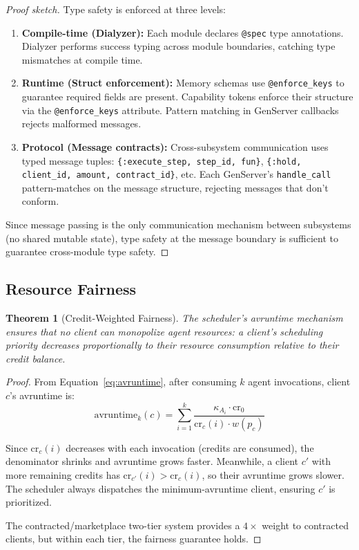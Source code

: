 \documentclass[12pt,a4paper]{article}
\newtheorem{theorem}{Theorem}[section]
\theoremstyle{definition}
\begin{document}
\begin{proof}[Proof sketch]
Type safety is enforced at three levels:

\begin{enumerate}
  \item \textbf{Compile-time (Dialyzer):} Each module declares \texttt{@spec} type
        annotations. Dialyzer performs success typing across module boundaries,
        catching type mismatches at compile time.

  \item \textbf{Runtime (Struct enforcement):} Memory schemas use
        \texttt{@enforce\_keys} to guarantee required fields are present.
        Capability tokens enforce their structure via the \texttt{@enforce\_keys}
        attribute. Pattern matching in GenServer callbacks rejects malformed messages.

  \item \textbf{Protocol (Message contracts):} Cross-subsystem communication uses
        typed message tuples: \texttt{\{:execute\_step, step\_id, fun\}},
        \texttt{\{:hold, client\_id, amount, contract\_id\}}, etc. Each GenServer's
        \texttt{handle\_call} pattern-matches on the message structure, rejecting
        messages that don't conform.
\end{enumerate}

Since message passing is the only communication mechanism between subsystems
(no shared mutable state), type safety at the message boundary is sufficient
to guarantee cross-module type safety.
\end{proof}

\subsection{Resource Fairness}

\begin{theorem}[Credit-Weighted Fairness]\label{thm:fairness}
The scheduler's avruntime mechanism ensures that no client can monopolize agent
resources: a client's scheduling priority decreases proportionally to their
resource consumption relative to their credit balance.
\end{theorem}

\begin{proof}
From Equation~\ref{eq:avruntime}, after consuming $k$ agent invocations, client $c$'s
avruntime is:
\[
  \text{avruntime}_k(c) = \sum_{i=1}^{k} \frac{\kappa_{A_i} \cdot \text{cr}_0}{\text{cr}_c(i) \cdot w(p_c)}
\]

Since $\text{cr}_c(i)$ decreases with each invocation (credits are consumed), the
denominator shrinks and avruntime grows faster. Meanwhile, a client $c'$ with more
remaining credits has $\text{cr}_{c'}(i) > \text{cr}_c(i)$, so their avruntime grows
slower. The scheduler always dispatches the minimum-avruntime client, ensuring
$c'$ is prioritized.

The contracted/marketplace two-tier system provides a $4\times$ weight to contracted
clients, but within each tier, the fairness guarantee holds.
\end{proof}
\end{document}
